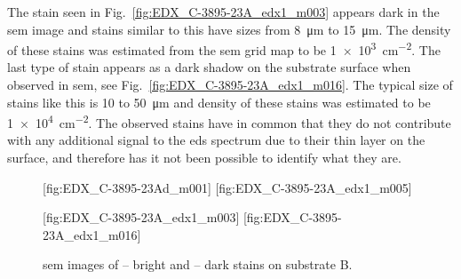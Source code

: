 The stain seen in Fig.~\ref{fig:EDX_C-3895-23A_edx1_m003} appears dark in the \ac{sem} image and stains similar to this have sizes from \SI{8}{\micro\metre} to \SI{15}{\micro\metre}. The density of these stains was estimated from the \ac{sem} grid map to be \SI{1e3}{\centi\metre^{-2}}. The last type of stain appears as a dark shadow on the substrate surface when observed in \ac{sem}, see Fig.~\ref{fig:EDX_C-3895-23A_edx1_m016}. The typical size of stains like this is \SI{10}{} to \SI{50}{\micro\metre} and density of these stains was estimated to be \SI{1e4}{\centi\metre^{-2}}. The observed stains have in common that they do not contribute with any additional signal to the \ac{eds} spectrum due to their thin layer on the surface, and therefore has it not been possible to identify what they are. 
\begin{figure}[htbp]
    \centering
    [fig:EDX_C-3895-23Ad_m001]
    [fig:EDX_C-3895-23A_edx1_m005]
    \par\bigskip
    [fig:EDX_C-3895-23A_edx1_m003]
    [fig:EDX_C-3895-23A_edx1_m016]
    \caption[\Ac{sem} images of stains on substrate B.]{\Ac{sem} images of -- bright and -- dark stains on substrate B.}
    \label{fig:subB_stains}
\end{figure}

